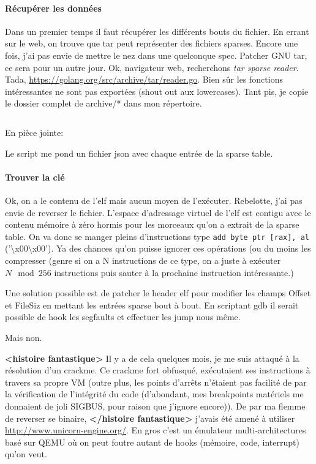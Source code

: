\documentclass[14pt]{article}
\let\oldinputminted\inputminted
\renewcommand{\inputminted}[2]{\begin{tcolorbox}\oldinputminted[breaklines]{#1}{#2}\end{tcolorbox}}
\begin{document}
\FloatBarrier
\paragraph{Récupérer les données}
Dans un premier temps il faut récupérer les différents bouts du fichier. En errant sur le web, on trouve que tar peut représenter des fichiers sparses. Encore une fois, j'ai pas envie de mettre le nez dans une quelconque spec. Patcher GNU tar, ce sera pour un autre jour. Ok, navigateur web, recherchons {\em tar sparse reader}. Tada, \url{https://golang.org/src/archive/tar/reader.go}.
Bien sûr les fonctions intéressantes ne sont pas exportées (shout out aux lowercases).
Tant pis, je copie le dossier complet de archive/* dans mon répertoire.
\inputminted{go}{./challs/part2/huge/archive/tar/test.go}

En pièce jointe: 

Le script me pond un fichier json avec chaque entrée de la sparse table.

\FloatBarrier
\paragraph{Trouver la clé}
Ok, on a le contenu de l'elf mais aucun moyen de l'exécuter. Rebelotte, j'ai pas envie de reverser le fichier.
L'espace d'adressage virtuel de l'elf est contigu avec le contenu mémoire à zéro hormis pour les morceaux qu'on a extrait de la sparse table.
On va donc se manger pleins d'instructions type \texttt{add byte ptr [rax], al} ('\textbackslash x00\textbackslash x00').
Ya des chances qu'on puisse ignorer ces opérations (ou du moins les compresser (genre si on a N instructions de ce type, on a juste à exécuter $N \mod 256$ instructions puis sauter à la prochaine instruction intéressante.)

Une solution possible est de patcher le header elf pour modifier les champs Offset et FileSiz en mettant les entrées sparse bout à bout. En scriptant gdb il serait possible de hook les segfaults et effectuer les jump nous même.

Mais non.

\textbf{<histoire fantastique>} Il y a de cela quelques mois, je me suis attaqué à la résolution d'un crackme. Ce crackme fort obfusqué, exécutaient ses instructions à travers sa propre VM (outre plus,  les points d'arrêts n'étaient pas facilité de par la vérification de l'intégrité du code (d'abondant, mes breakpoints matériels me donnaient de joli SIGBUS, pour raison que j'ignore encore)). De par ma flemme de reverser se binaire, \textbf{</histoire fantastique>} j'avais été amené à utiliser \url{http://www.unicorn-engine.org/}.
En gros c'est un émulateur multi-architectures basé sur QEMU où on peut foutre autant de hooks (mémoire, code, interrupt) qu'on veut.
\end{document}
